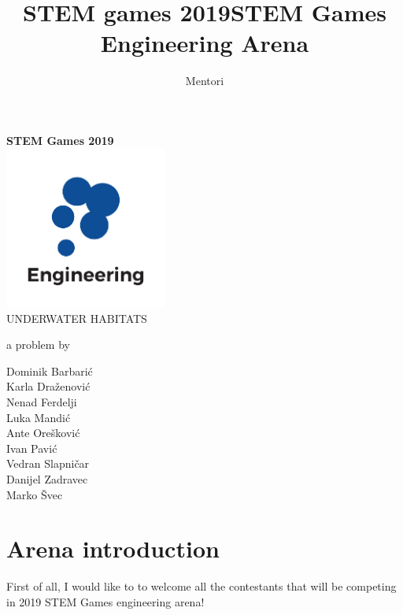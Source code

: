 \documentclass{article}
\title{STEM games 2019}
\author{Mentori}
\title{STEM Games Engineering Arena}
\date{}
\begin{document}
	
	\thispagestyle{empty}
	\newpage
	\thispagestyle{empty}
	\vspace*{0cm}
	\begin{center}
		
		\textbf{\Huge{STEM Games 2019}}\\
		\vspace*{2.4cm}
		\includegraphics[width=0.4\textwidth]{logos/engineering} \\
		\vspace*{2.4cm}
		\huge{UNDERWATER HABITATS}
		
		\medskip
		
		\normalsize{a problem by}
		
		\medskip
		
		Dominik Barbarić \\
		Karla Draženović \\
		Nenad Ferdelji \\
		Luka Mandić \\
		Ante Orešković \\
		Ivan Pavić \\
		Vedran Slapničar \\
		Danijel Zadravec \\
		Marko Švec 
		
		\vspace{6cm}
		
		
		\normalsize{}
	\end{center}

	\newpage
	\section{Arena introduction}
	
	First of all, I would like to to welcome all the contestants that will be 
	competing in 
	2019 STEM Games engineering arena!
	
\end{document}
